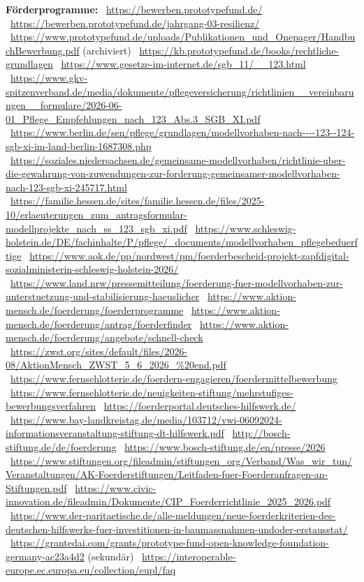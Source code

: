 \documentclass[10pt,parskip=half-]{scrartcl}
\begin{document}
{\tiny\raggedright\textbf{Förderprogramme:}
\textbullet~\url{https://bewerben.prototypefund.de/}
\textbullet~\url{https://bewerben.prototypefund.de/jahrgang-03-resilienz/}
\textbullet~\url{https://www.prototypefund.de/uploads/Publikationen_und_Onepager/HandbuchBewerbung.pdf} (archiviert)
\textbullet~\url{https://kb.prototypefund.de/books/rechtliche-grundlagen}
\textbullet~\url{https://www.gesetze-im-internet.de/sgb_11/__123.html}
\textbullet~\url{https://www.gkv-spitzenverband.de/media/dokumente/pflegeversicherung/richtlinien__vereinbarungen__formulare/2026-06-01_Pflege_Empfehlungen_nach_123_Abs.3_SGB_XI.pdf}
\textbullet~\url{https://www.berlin.de/sen/pflege/grundlagen/modellvorhaben-nach----123--124-sgb-xi-im-land-berlin-1687308.php}
\textbullet~\url{https://soziales.niedersachsen.de/gemeinsame-modellvorhaben/richtlinie-uber-die-gewahrung-von-zuwendungen-zur-forderung-gemeinsamer-modellvorhaben-nach-123-sgb-xi-245717.html}
\textbullet~\url{https://familie.hessen.de/sites/familie.hessen.de/files/2025-10/erlaeuterungen_zum_antragsformular-modellprojekte_nach_ss_123_sgb_xi.pdf}
\textbullet~\url{https://www.schleswig-holstein.de/DE/fachinhalte/P/pflege/_documents/modellvorhaben_pflegebeduerftige}
\textbullet~\url{https://www.aok.de/pp/nordwest/pm/foerderbescheid-projekt-zapfdigital-sozialministerin-schleswig-holstein-2026/}
\textbullet~\url{https://www.land.nrw/pressemitteilung/foerderung-fuer-modellvorhaben-zur-unterstuetzung-und-stabilisierung-haeuslicher}
\textbullet~\url{https://www.aktion-mensch.de/foerderung/foerderprogramme}
\textbullet~\url{https://www.aktion-mensch.de/foerderung/antrag/foerderfinder}
\textbullet~\url{https://www.aktion-mensch.de/foerderung/angebote/schnell-check}
\textbullet~\url{https://zwst.org/sites/default/files/2026-08/AktionMensch_ZWST_5_6_2026_\%20end.pdf}
\textbullet~\url{https://www.fernsehlotterie.de/foerdern-engagieren/foerdermittelbewerbung}
\textbullet~\url{https://www.fernsehlotterie.de/neuigkeiten-stiftung/mehrstufiges-bewerbungsverfahren}
\textbullet~\url{https://foerderportal.deutsches-hilfswerk.de/}
\textbullet~\url{https://www.bay-landkreistag.de/media/103712/vwi-06092024-informationsveranstaltung-stiftung-dt-hilfswerk.pdf}
\textbullet~\url{http://bosch-stiftung.de/de/foerderung}
\textbullet~\url{https://www.bosch-stiftung.de/en/presse/2026}
\textbullet~\url{https://www.stiftungen.org/fileadmin/stiftungen_org/Verband/Was_wir_tun/Veranstaltungen/AK-Foerderstiftungen/Leitfaden-fuer-Foerderanfragen-an-Stiftungen.pdf}
\textbullet~\url{https://www.civic-innovation.de/fileadmin/Dokumente/CIP_Foerderrichtlinie_2025_2026.pdf}
\textbullet~\url{https://www.der-paritaetische.de/alle-meldungen/neue-foerderkriterien-des-deutschen-hilfswerks-fuer-investitionen-in-baumassnahmen-undoder-erstausstat/}
\textbullet~\url{https://grantedai.com/grants/prototype-fund-open-knowledge-foundation-germany-ac23a4d2} (sekundär)
\textbullet~\url{https://interoperable-europe.ec.europa.eu/collection/eupl/faq}
\par}
\end{document}

